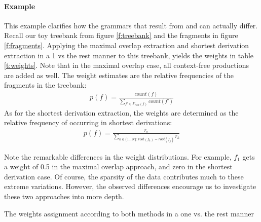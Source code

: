 


\paragraph{Example}
\FloatBarrier
This example clarifies how the grammars that result from \ddop{} and \dops{} can actually differ. Recall our toy treebank from figure \ref{f:treebank} and the fragments in figure \ref{f:fragments}. 
Applying the maximal overlap extraction and shortest derivation extraction in a 1 vs the rest manner to this treebank, yields the weights in table \ref{t:weights}.
 Note that in the maximal overlap case, all context-free productions are added as well. The weight estimates are the relative frequencies of the fragments in the treebank\cite{sangati2011}: 
\begin{align}p(f)=\frac{count(f)}{\sum_{f'\in F_{root}(f)} count(f')}\end{align} As for the shortest derivation extraction, the weights are determined as the relative frequency of occurring in shortest derivations\cite{zollmann2005}: 
\begin{align}p(f)=\frac{r_c}{\sum_{k\in \{1\ldots N\}:root(f_k)=root(f_j)} r_k}\end{align}

Note the remarkable differences in the weight distributions. For example, $f_1$ gets a weight of 0.5 in the maximal overlap approach, and zero in the shortest derivation case. Of course, the sparsity of the data contributes much to these extreme variations. However, the observed differences encourage us to investigate these two approaches into more depth.



\begin{table}[h!]
\center

\caption{The weights assignment according to both methods in a one vs. the rest manner}
\label{t:weights}
\end{table}





